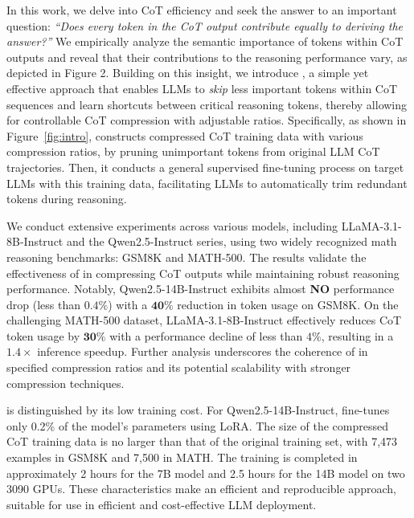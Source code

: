 In this work, we delve into CoT efficiency and seek the answer to an important question: \textit{``Does every token in the CoT output contribute equally to deriving the answer?''} We empirically analyze the semantic importance of tokens within CoT outputs and reveal that their contributions to the reasoning performance vary, as depicted in Figure 2. Building on this insight, we introduce \method, a simple yet effective approach that enables LLMs to \textit{skip} less important tokens within CoT sequences and learn shortcuts between critical reasoning tokens, thereby allowing for controllable CoT compression with adjustable ratios. Specifically, as shown in Figure~\ref{fig:intro}, \method constructs compressed CoT training data with various compression ratios, by pruning unimportant tokens from original LLM CoT trajectories. Then, it conducts a general supervised fine-tuning process on target LLMs with this training data, facilitating LLMs to automatically trim redundant tokens during reasoning.

We conduct extensive experiments across various models, including LLaMA-3.1-8B-Instruct and the Qwen2.5-Instruct series, using two widely recognized math reasoning benchmarks: GSM8K and MATH-500. The results validate the effectiveness of \method in compressing CoT outputs while maintaining robust reasoning performance. Notably, Qwen2.5-14B-Instruct exhibits almost \textbf{NO} performance drop (less than $0.4\%$) with a $\bm{40\%}$ reduction in token usage on GSM8K. On the challenging MATH-500 dataset, LLaMA-3.1-8B-Instruct effectively reduces CoT token usage by $\bm{30}\%$ with a performance decline of less than $4\%$, resulting in a $\bm{1.4}\times$ inference speedup. Further analysis underscores the coherence of \method in specified compression ratios and its potential scalability with stronger compression techniques.

\method is distinguished by its low training cost. For Qwen2.5-14B-Instruct, \method fine-tunes only 0.2\% of the model's parameters using LoRA. The size of the compressed CoT training data is no larger than that of the original training set, with 7,473 examples in GSM8K and 7,500 in MATH. The training is completed in approximately 2 hours for the 7B model and 2.5 hours for the 14B model on two 3090 GPUs. These characteristics make \method an efficient and reproducible approach, suitable for use in efficient and cost-effective LLM deployment.

